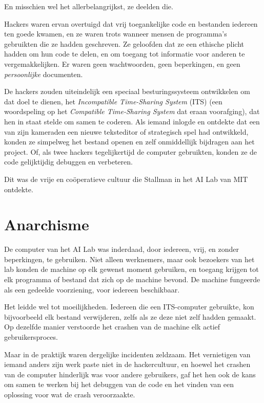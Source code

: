 \documentclass[
  a5paper,
  smalldemyvopaper,11pt,twoside,onecolumn,openright,extrafontsizes,
hidelinks]{memoir}
\begin{document}
En misschien wel het allerbelangrijkst, ze deelden die.

Hackers waren ervan overtuigd dat vrij toegankelijke code en bestanden
iedereen ten goede kwamen, en ze waren trots wanneer mensen de
programma's gebruikten die ze hadden geschreven. Ze geloofden dat ze een
ethische plicht hadden om hun code te delen, en om toegang tot
informatie voor anderen te vergemakkelijken. Er waren geen wachtwoorden,
geen beperkingen, en geen \emph{persoonlijke} documenten.

De hackers zouden uiteindelijk een speciaal besturingssysteem
ontwikkelen om dat doel te dienen, het \emph{Incompatible Time-Sharing
System} (ITS) (een woordspeling op het \emph{Compatible Time-Sharing
System} dat eraan voorafging), dat hen in staat stelde om samen te
coderen. Als iemand inlogde en ontdekte dat een van zijn kameraden een
nieuwe teksteditor of strategisch spel had ontwikkeld, konden ze
simpelweg het bestand openen en zelf onmiddellijk bijdragen aan het
project. Of, als twee hackers tegelijkertijd de computer gebruikten,
konden ze de code gelijktijdig debuggen en verbeteren.

Dit was de vrije en coöperatieve cultuur die Stallman in het AI Lab van
MIT ontdekte.

\section{Anarchisme}\label{anarchisme}

De computer van het AI Lab was inderdaad, door iedereen, vrij, en zonder
beperkingen, te gebruiken. Niet alleen werknemers, maar ook bezoekers
van het lab konden de machine op elk gewenst moment gebruiken, en
toegang krijgen tot elk programma of bestand dat zich op de machine
bevond. De machine fungeerde als een gedeelde voorziening, voor iedereen
beschikbaar.

Het leidde wel tot moeilijkheden. Iedereen die een ITS-computer
gebruikte, kon bijvoorbeeld elk bestand verwijderen, zelfs als ze deze
niet zelf hadden gemaakt. Op dezelfde manier verstoorde het crashen van
de machine elk actief gebruikersproces.

Maar in de praktijk waren dergelijke incidenten zeldzaam. Het
vernietigen van iemand anders zijn werk paste niet in de hackercultuur,
en hoewel het crashen van de computer hinderlijk was voor andere
gebruikers, gaf het hen ook de kans om samen te werken bij het debuggen
van de code en het vinden van een oplossing voor wat de crash
veroorzaakte.
\end{document}
